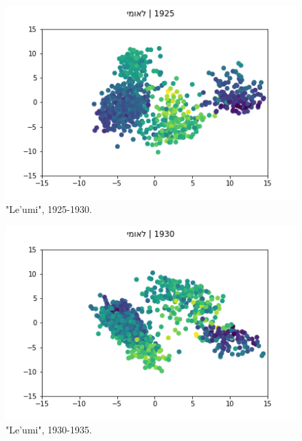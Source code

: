 \documentclass[10pt, a4paper]{article}
\begin{document}
\begin{figure}[!h]
\begin{center}
\includegraphics[scale=0.5]{LREC_PAPER/leumi_cwes/1925.png}
\caption{"Le'umi", 1925-1930.}
\label{Leumi4}
\end{center}
\end{figure}

\begin{figure}[!h]
\begin{center}
\includegraphics[scale=0.5]{LREC_PAPER/leumi_cwes/1930.png}
\caption{"Le'umi", 1930-1935.}
\label{Leumi5}
\end{center}
\end{figure}
\end{document}
